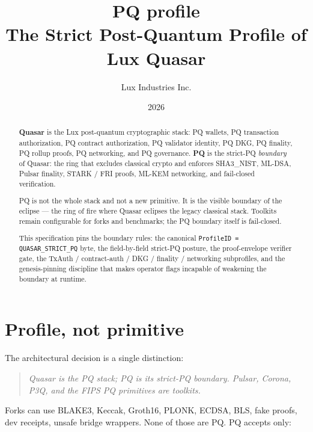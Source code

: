 \documentclass[11pt,a4paper]{article}
\title{PQ profile\\
       \large The Strict Post-Quantum Profile of Lux Quasar}
\author{Lux Industries Inc.}
\date{2026}
\newcommand{\PQ}{\textsf{PQ}}
\begin{document}
\luxcoverpage
\maketitle

\begin{abstract}
\textbf{Quasar} is the Lux post-quantum cryptographic stack:
\PQ{} wallets, \PQ{} transaction authorization, \PQ{} contract
authorization, \PQ{} validator identity, \PQ{} DKG, \PQ{} finality,
\PQ{} rollup proofs, \PQ{} networking, and \PQ{} governance.
\textbf{\PQ{}} is the strict-PQ \emph{boundary} of Quasar:
the ring that excludes classical crypto and enforces SHA3\_NIST,
ML-DSA, Pulsar finality, STARK / FRI proofs, ML-KEM networking,
and fail-closed verification.

\PQ{} is not the whole stack and not a new primitive. It is
the visible boundary of the eclipse --- the ring of fire where
Quasar eclipses the legacy classical stack. Toolkits remain
configurable for forks and benchmarks; the PQ boundary
itself is fail-closed.

This specification pins the boundary rules: the canonical
\texttt{ProfileID = QUASAR\_STRICT\_PQ} byte, the field-by-field
strict-PQ posture, the proof-envelope verifier gate, the
TxAuth / contract-auth / DKG / finality / networking subprofiles,
and the genesis-pinning discipline that makes operator flags
incapable of weakening the boundary at runtime.
\end{abstract}

\tableofcontents

\section{Profile, not primitive}
\label{sec:profile}

The architectural decision is a single distinction:

\begin{quote}
\emph{Quasar is the PQ stack; \PQ{} is its strict-PQ
boundary. Pulsar, Corona, P3Q, and the FIPS PQ primitives are
toolkits.}
\end{quote}

Forks can use BLAKE3, Keccak, Groth16, PLONK, ECDSA, BLS, fake
proofs, dev receipts, unsafe bridge wrappers. None of those are
\PQ{}. \PQ{} accepts only:
\end{document}
